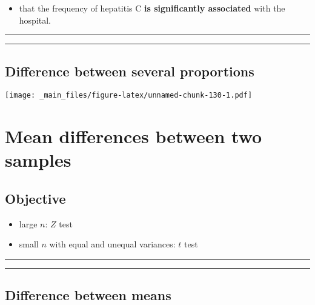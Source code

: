 \documentclass[
]{book}
\providecommand{\tightlist}{%
  \setlength{\itemsep}{0pt}\setlength{\parskip}{0pt}}
\begin{document}
\begin{itemize}
\tightlist
\item
  that the frequency of hepatitis C \textbf{is significantly associated} with the hospital.
\end{itemize}

\begin{center}\rule{0.5\linewidth}{0.5pt}\end{center}

\begin{center}\rule{0.5\linewidth}{0.5pt}\end{center}

\hypertarget{difference-between-several-proportions-3}{%
\section{Difference between several proportions}\label{difference-between-several-proportions-3}}

\texttt{[image: \_main\_files/figure-latex/unnamed-chunk-130-1.pdf]}

\hypertarget{mean-differences-between-two-samples}{%
\chapter{Mean differences between two samples}\label{mean-differences-between-two-samples}}

\hypertarget{objective-15}{%
\section{Objective}\label{objective-15}}

\begin{itemize}
\tightlist
\item
  large \(n\): \(Z\) test
\item
  small \(n\) with equal and unequal variances: \(t\) test
\end{itemize}

\begin{center}\rule{0.5\linewidth}{0.5pt}\end{center}

\begin{center}\rule{0.5\linewidth}{0.5pt}\end{center}

\hypertarget{difference-between-means}{%
\section{Difference between means}\label{difference-between-means}}
\end{document}
